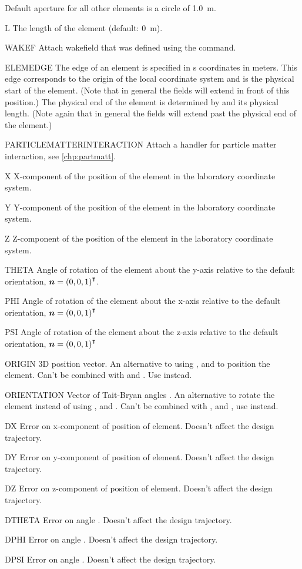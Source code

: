 \begin{kdescription}
  Default aperture for all other elements is a circle of \SI{1.0}{\meter}.

\item[L]
  The length of the element (default: \SI{0}{\meter}).
\item[WAKEF]
  Attach wakefield that was defined using the  command.
\item[ELEMEDGE]
    The edge of an element is specified in s coordinates in meters. This edge corresponds to the origin of the local coordinate system and is the physical start of the element. (Note that in general the fields will extend in front of this position.) The physical end of the element is determined by  and its physical length. (Note again that in general the fields will extend past the physical end of the element.)
\item[PARTICLEMATTERINTERACTION]
  Attach a handler for particle matter interaction, see \ref{chp:partmatt}.
\item[X]
  X-component of the position of the element in the laboratory coordinate system.
\item[Y]
  Y-component of the position of the element in the laboratory coordinate system.
\item[Z]
  Z-component of the position of the element in the laboratory coordinate system.
\item[THETA]
  Angle of rotation of the element about the y-axis relative to the default orientation, ${\bm{n}} = \left(0, 0, 1\right)^\intercal$.
\item[PHI]
  Angle of rotation of the element about the x-axis relative to the default orientation, ${\bm{n}} = \left(0, 0, 1\right)^\intercal$ \item[PSI]
  Angle of rotation of the element about the z-axis relative to the default orientation, ${\bm{n}} = \left(0, 0, 1\right)^\intercal$ \item[ORIGIN]
  3D position vector. An alternative to using ,  and  to position the element. Can't be combined with  and . Use  instead.
\item[ORIENTATION]
  Vector of Tait-Bryan angles \cite{bib:tait-bryan}. An alternative to rotate the element instead of using ,  and . Can't be combined with ,  and , use  instead.
\item[DX]
  Error on x-component of position of element. Doesn't affect the design trajectory.
\item[DY]
  Error on y-component of position of element. Doesn't affect the design trajectory.
\item[DZ]
  Error on z-component of position of element. Doesn't affect the design trajectory.
\item[DTHETA]
  Error on angle . Doesn't affect the design trajectory.
\item[DPHI]
  Error on angle . Doesn't affect the design trajectory.
\item[DPSI]
  Error on angle . Doesn't affect the design trajectory.


\end{kdescription}
